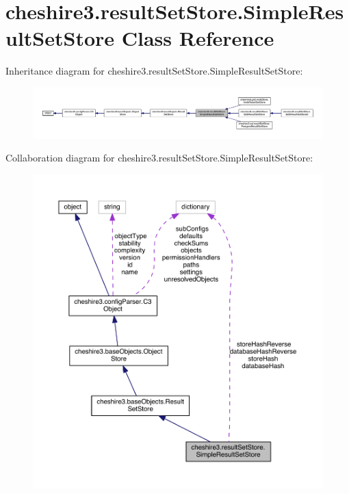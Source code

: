 \hypertarget{classcheshire3_1_1result_set_store_1_1_simple_result_set_store}{\section{cheshire3.\-result\-Set\-Store.\-Simple\-Result\-Set\-Store Class Reference}
\label{classcheshire3_1_1result_set_store_1_1_simple_result_set_store}
}


Inheritance diagram for cheshire3.\-result\-Set\-Store.\-Simple\-Result\-Set\-Store\-:
\nopagebreak
\begin{figure}[H]
\begin{center}
\leavevmode
\includegraphics[width=350pt]{classcheshire3_1_1result_set_store_1_1_simple_result_set_store__inherit__graph}
\end{center}
\end{figure}


Collaboration diagram for cheshire3.\-result\-Set\-Store.\-Simple\-Result\-Set\-Store\-:
\nopagebreak
\begin{figure}[H]
\begin{center}
\leavevmode
\includegraphics[width=350pt]{classcheshire3_1_1result_set_store_1_1_simple_result_set_store__coll__graph}
\end{center}
\end{figure}
